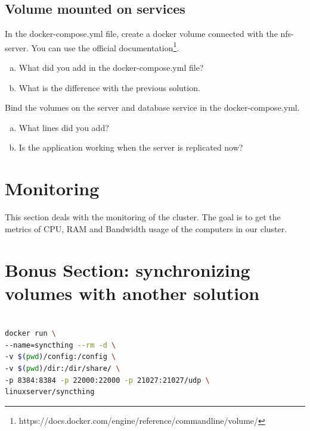 \documentclass[a4paper,11pt]{exam}
\begin{document}
\subsection{Volume mounted on services}
\begin{questions}
	\question In the docker-compose.yml file, create a docker volume connected with the nfs-server. You can use the official documentation\footnote{https://docs.docker.com/engine/reference/commandline/volume/}.
	\begin{enumerate}[(a)]
		\item What did you add in the docker-compose.yml file?
		\item What is the difference with the previous solution.
	\end{enumerate}
	\question Bind the volumes on the server and database service in the docker-compose.yml.
	\begin{enumerate}[(a)]
		\item What lines did you add?
		\item Is the application working when the server is replicated now?
	\end{enumerate}
\end{questions}

\section{Monitoring}

This section deals with the monitoring of the cluster. The goal is to get the metrics of CPU, RAM and Bandwidth usage of the computers in our cluster.



\section{Bonus Section: synchronizing volumes with another solution}


\begin{lstlisting}[frame=single,language={sh}]  % Start your code-block

docker run \
--name=syncthing --rm -d \
-v $(pwd)/config:/config \
-v $(pwd)/dir:/dir/share/ \
-p 8384:8384 -p 22000:22000 -p 21027:21027/udp \
linuxserver/syncthing				
\end{lstlisting}
\end{document}
